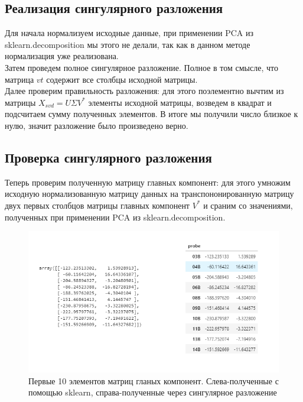 \documentclass[a4]{article}
\begin{document}
	\subsection{Реализация сингулярного разложения}
	Для начала нормализуем исходные данные, при применении PCA из sklearn.decomposition мы этого не делали, так как в данном методе нормализация уже реализована.\\
	
	Затем проведем полное сингулярное разложение. Полное в том смысле, что матрица $vt$ содержит все столбцы исходной матрицы.\\
	
	Далее проверим правильность разложения: для этого поэлементно вычтим из матрицы $X_{svd} = U\Sigma V^{*}$ элементы исходной матрицы, возведем в квадрат и подсчитаем сумму полученных элементов. В итоге мы получили число близкое к нулю, значит разложение было произведено верно.
	
	\subsection{Проверка сингулярного разложения}
	Теперь проверим полученную матрицу главных компонент: для этого умножим исходную нормализованную матрицу данных на транспононированную матрицу двух первых столбцов матрицы главных компонент $V^*$ и сраним со значениями, полученных при применении  PCA из sklearn.decomposition.
	\begin{figure}[h!]
		\includegraphics[width=\textwidth]{2PC.png}\caption[Первые 10 элементов матриц гланых компонент. Слева-полученные с помощью sklearn, справа-полученные через сингулярное разложение]{Первые 10 элементов матриц гланых компонент. Слева-полученные с помощью sklearn, справа-полученные через сингулярное разложение}
	\end{figure} \\
\end{document}
